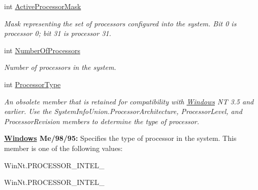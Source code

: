 \begin{DoxyCompactItemize}
int \hyperlink{struct_tao_1_1_platform_1_1_windows_1_1_kernel_1_1_s_y_s_t_e_m___i_n_f_o_ab4d5f2e6af269fd08c2a05fe2b9c821b}{ActiveProcessorMask}
\begin{DoxyCompactList}\small\item\em Mask representing the set of processors configured into the system. Bit 0 is processor 0; bit 31 is processor 31. \item\end{DoxyCompactList}\item 
int \hyperlink{struct_tao_1_1_platform_1_1_windows_1_1_kernel_1_1_s_y_s_t_e_m___i_n_f_o_a0ac7829baa6c9870245d5ce59d539356}{NumberOfProcessors}
\begin{DoxyCompactList}\small\item\em Number of processors in the system. \item\end{DoxyCompactList}\item 
int \hyperlink{struct_tao_1_1_platform_1_1_windows_1_1_kernel_1_1_s_y_s_t_e_m___i_n_f_o_ac5729610c75fec173cab9d4e363bcc03}{ProcessorType}
\begin{DoxyCompactList}\small\item\em An obsolete member that is retained for compatibility with \hyperlink{namespace_tao_1_1_platform_1_1_windows}{Windows} NT 3.5 and earlier. Use the {\itshape SystemInfoUnion.ProcessorArchitecture\/}, {\itshape ProcessorLevel\/}, and {\itshape ProcessorRevision\/} members to determine the type of processor. 

{\bfseries \hyperlink{namespace_tao_1_1_platform_1_1_windows}{Windows} Me/98/95:} Specifies the type of processor in the system. This member is one of the following values: 

WinNt.PROCESSOR\_\-INTEL\_ 

WinNt.PROCESSOR\_\-INTEL\_ 


\end{DoxyCompactList}
\end{DoxyCompactItemize}

